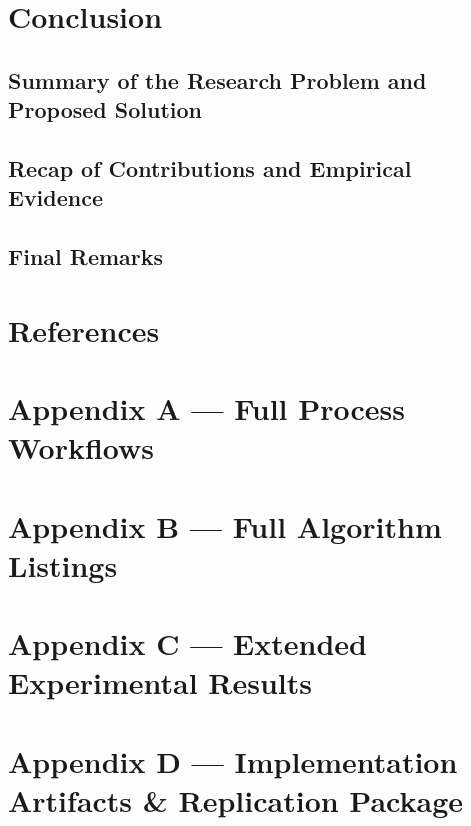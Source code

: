 \documentclass[11pt,a4paper]{article}
\begin{document}
\section{Conclusion}
\subsection{Summary of the Research Problem and Proposed Solution}
\subsection{Recap of Contributions and Empirical Evidence}
\subsection{Final Remarks}

\newpage

\section*{References}

\section*{Appendix A --- Full Process Workflows}

\section*{Appendix B --- Full Algorithm Listings}

\section*{Appendix C --- Extended Experimental Results}

\section*{Appendix D --- Implementation Artifacts \& Replication Package}
\end{document}
